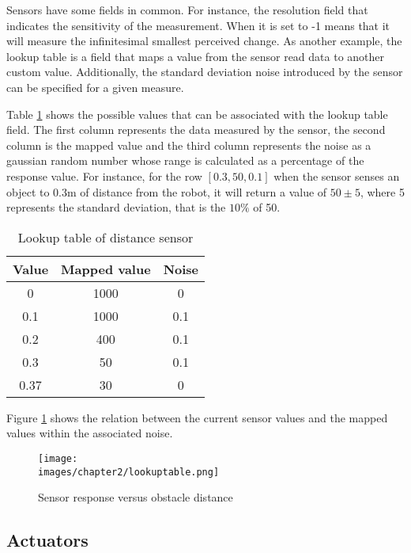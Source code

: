 Sensors have some fields in common. For instance, the resolution field that indicates the sensitivity of the measurement. When it is set to -1 means that it will measure the infinitesimal smallest perceived change. As another example, the lookup table is a field that maps a value from the sensor read data to another custom value. Additionally, the standard deviation noise introduced by the sensor can be specified for a given measure. 

Table \ref{tab:ch-2:lookup} shows the possible values that can be associated with the lookup table field. The first column represents the data measured by the sensor, the second column is the mapped value and the third column represents the noise as a gaussian random number whose range is calculated as a percentage of the response value\cite{cyberbotics}. For instance, for the row $[0.3, 50, 0.1]$ when the sensor senses an object to 0.3m of distance from the robot, it will return a value of $50 \pm 5$, where 5 represents the standard deviation, that is the $10\%$ of 50.
\begin{table}[h!]
\centering
 \begin{tabular}{c c c} 
 \hline
 Value & Mapped value & Noise \\ [0.5ex] 
 \hline\hline
 0 & 1000 & 0 \\ 
 \hline
0.1 & 1000 & 0.1 \\ 
 \hline
 0.2 & 400 & 0.1 \\ 
 \hline
 0.3 & 50 & 0.1 \\ 
 \hline
 0.37 & 30 & 0 \\ 
 \hline
\end{tabular}
\caption{Lookup table of distance sensor}
\label{tab:ch-2:lookup}
\end{table}

Figure \ref{fig:ch-2:lookup} shows the relation between the current sensor values and the mapped values within the associated noise.

\begin{figure}[h!]
  \centering
  \texttt{[image: \\images/chapter2/lookuptable.png]}
  \caption{Sensor response versus obstacle distance}
  \label{fig:ch-2:lookup}
\end{figure}

\subsection{Actuators}

